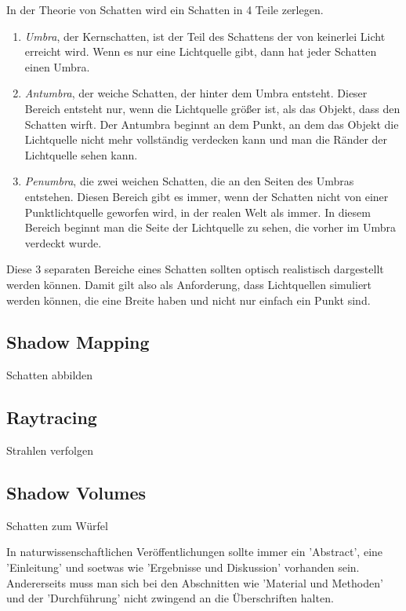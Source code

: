 \documentclass[10pt,twocolumn]{scrartcl}
\begin{document}
In der Theorie von Schatten wird ein Schatten in 4 Teile zerlegen.
\begin{enumerate}
 \item \emph{Umbra}, der Kernschatten, ist der Teil des Schattens der von keinerlei Licht erreicht wird.
       Wenn es nur eine Lichtquelle gibt, dann hat jeder Schatten einen Umbra.
 \item \emph{Antumbra}, der weiche Schatten, der hinter dem Umbra entsteht. Dieser Bereich entsteht nur,
       wenn die Lichtquelle größer ist, als das Objekt, dass den Schatten wirft. Der Antumbra beginnt an
       dem Punkt, an dem das Objekt die Lichtquelle nicht mehr vollständig verdecken kann und man die
       Ränder der Lichtquelle sehen kann.
 \item \emph{Penumbra}, die zwei weichen Schatten, die an den Seiten des Umbras entstehen. Diesen Bereich
       gibt es immer, wenn der Schatten nicht von einer Punktlichtquelle geworfen wird, in der realen
       Welt als immer. In diesem Bereich beginnt man die Seite der Lichtquelle zu sehen, die vorher im
       Umbra verdeckt wurde.
\end{enumerate}
Diese 3 separaten Bereiche eines Schatten sollten optisch realistisch dargestellt werden können.
Damit gilt also als Anforderung, dass Lichtquellen simuliert werden können, die eine Breite haben
und nicht nur einfach ein Punkt sind.


\subsection{Shadow Mapping}

Schatten abbilden

\subsection{Raytracing}

Strahlen verfolgen

\subsection{Shadow Volumes}

Schatten zum Würfel

In naturwissenschaftlichen Veröffentlichungen sollte immer 
ein 'Abstract', eine 'Einleitung' und soetwas wie 'Ergebnisse und
Diskussion' vorhanden sein. Andererseits muss man sich bei den
Abschnitten wie 'Material und Methoden' und der 'Durchführung'
nicht zwingend an die Überschriften halten. 
\end{document}
